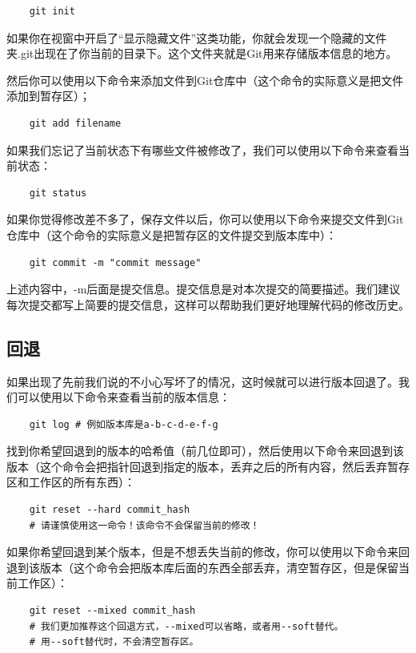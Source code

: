 \begin{verbatim}
    git init
\end{verbatim}

如果你在视窗中开启了“显示隐藏文件”这类功能，你就会发现一个隐藏的文件夹.git出现在了你当前的目录下。这个文件夹就是Git用来存储版本信息的地方。

然后你可以使用以下命令来添加文件到Git仓库中（这个命令的实际意义是把文件添加到暂存区）；

\begin{verbatim}
    git add filename
\end{verbatim}

如果我们忘记了当前状态下有哪些文件被修改了，我们可以使用以下命令来查看当前状态：
\begin{verbatim}
    git status
\end{verbatim}

如果你觉得修改差不多了，保存文件以后，你可以使用以下命令来提交文件到Git仓库中（这个命令的实际意义是把暂存区的文件提交到版本库中）：

\begin{verbatim}
    git commit -m "commit message"
\end{verbatim}

上述内容中，-m后面是提交信息。提交信息是对本次提交的简要描述。我们建议每次提交都写上简要的提交信息，这样可以帮助我们更好地理解代码的修改历史。

\subsection{回退}

如果出现了先前我们说的不小心写坏了的情况，这时候就可以进行版本回退了。我们可以使用以下命令来查看当前的版本信息：

\begin{verbatim}
    git log # 例如版本库是a-b-c-d-e-f-g
\end{verbatim}

找到你希望回退到的版本的哈希值（前几位即可），然后使用以下命令来回退到该版本（这个命令会把指针回退到指定的版本，丢弃之后的所有内容，然后丢弃暂存区和工作区的所有东西）：

\begin{verbatim}
    git reset --hard commit_hash
    # 请谨慎使用这一命令！该命令不会保留当前的修改！
\end{verbatim}

如果你希望回退到某个版本，但是不想丢失当前的修改，你可以使用以下命令来回退到该版本（这个命令会把版本库后面的东西全部丢弃，清空暂存区，但是保留当前工作区）：
\begin{verbatim}
    git reset --mixed commit_hash
    # 我们更加推荐这个回退方式，--mixed可以省略，或者用--soft替代。
    # 用--soft替代时，不会清空暂存区。
\end{verbatim}

